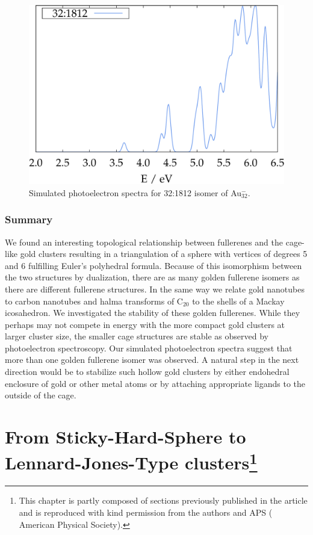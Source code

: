 \begin{figure}[htb]
\begin{center}
\includegraphics[width=.8\textwidth]{golddual/photo/Au32/nonrel/compare.pdf}
\caption{Simulated photoelectron spectra for 32:1812 isomer of Au$_{32}^-$.}
  \label{fig:photo_Au32}
\end{center}
\end{figure}


\subsection{Summary}

We found an interesting topological relationship between fullerenes and the
cage-like gold clusters resulting in a triangulation of a sphere with vertices
of degrees 5 and 6 fulfilling Euler's polyhedral formula. Because of this
isomorphism between the two structures by dualization, there are as many golden
fullerene isomers as there are different fullerene structures. In the same way
we relate gold nanotubes to carbon nanotubes and halma transforms of C$_{20}$
to the shells of a Mackay icosahedron. We investigated the stability of these
golden fullerenes. While they perhaps may not compete in energy with the more
compact gold clusters at larger cluster size, the smaller cage structures are
stable as observed by photoelectron spectroscopy. Our simulated photoelectron
spectra suggest that more than one golden fullerene isomer was observed. A
natural step in the next direction would be to stabilize such hollow gold
clusters by either endohedral enclosure of gold or other metal atoms or by
attaching appropriate ligands to the outside of the cage.

\chapter[From Sticky-Hard-Sphere to Lennard-Jones-Type clusters]{
    From Sticky-Hard-Sphere to Lennard-Jones-Type clusters\footnote{This
    chapter is partly composed of sections previously published in the article
    \autocite{Trombach_stickyhardsphereLennardJonestypeclusters_2018}
    and is reproduced with kind permission from the authors and APS
    ( American Physical Society).}
}
\label{sec:fromstickyhardspheretoLJtypeclusters}


